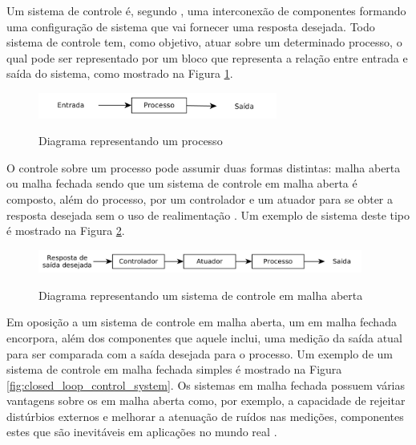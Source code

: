 Um sistema de controle é, segundo , uma interconexão de componentes formando uma configuração de sistema que vai fornecer uma resposta desejada. Todo sistema de controle tem, como objetivo, atuar sobre um determinado processo, o qual pode ser representado por um bloco que representa a relação entre entrada e saída do sistema, como mostrado na Figura \ref{fig:process}.

\begin{figure}[!htb]
    \centering
    \caption{Diagrama representando um processo}
    \includegraphics[width=0.7\textwidth]{./04-figuras/fund_teorica/process}
    \label{fig:process}
\end{figure}

O controle sobre um processo pode assumir duas formas distintas: malha aberta ou malha fechada sendo que um sistema de controle em malha aberta é composto, além do processo, por um controlador e um atuador para se obter a resposta desejada sem o uso de realimentação \cite[p.~2]{Dorf2011}. Um exemplo de sistema deste tipo é mostrado na Figura \ref{fig:open_loop_control_system}.

\begin{figure}[!htb]
    \centering
    \caption{Diagrama representando um sistema de controle em malha aberta}
    \includegraphics[width=0.95\textwidth]{./04-figuras/fund_teorica/open_loop_control_system}
    \label{fig:open_loop_control_system}
\end{figure}

Em oposição a um sistema de controle em malha aberta, um em malha fechada encorpora, além dos componentes que aquele inclui, uma medição da saída atual para ser comparada com a saída desejada para o processo. Um exemplo de um sistema de controle em malha fechada simples é mostrado na Figura \ref{fig:closed_loop_control_system}. Os sistemas em malha fechada possuem várias vantagens sobre os em malha aberta como, por exemplo, a capacidade de rejeitar distúrbios externos e melhorar a atenuação de ruídos nas medições, componentes estes que são inevitáveis em aplicações no mundo real \cite[p.~3]{Dorf2011}.

